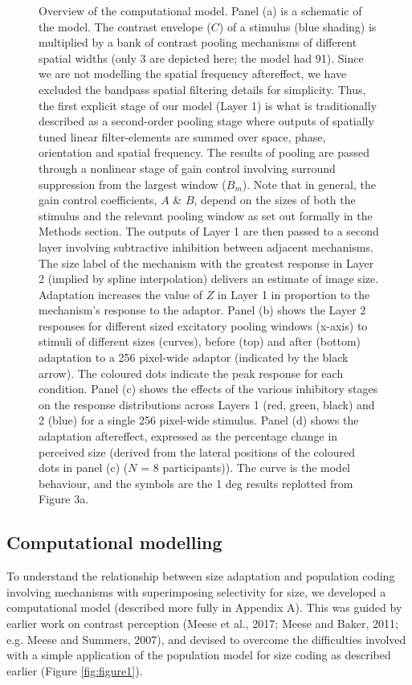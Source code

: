 \documentclass[
]{article}
\begin{document}
\begin{figure}
\caption{Overview of the computational model. Panel (a) is a schematic of the model. The contrast envelope ($C$) of a stimulus (blue shading) is multiplied by a bank of contrast pooling mechanisms of different spatial widths (only 3 are depicted here; the model had 91). Since we are not modelling the spatial frequency aftereffect, we have excluded the bandpass spatial filtering details for simplicity. Thus, the first explicit stage of our model (Layer 1) is what is traditionally described as a second-order pooling stage where outputs of spatially tuned linear filter-elements are summed over space, phase, orientation and spatial frequency. The results of pooling are passed through a nonlinear stage of gain control involving surround suppression from the largest window ($B_m$). Note that in general, the gain control coefficients, $A$ \& $B$, depend on the sizes of both the stimulus and the relevant pooling window as set out formally in the Methods section. The outputs of Layer 1 are then passed to a second layer involving subtractive inhibition between adjacent mechanisms. The size label of the mechanism with the greatest response in Layer 2 (implied by spline interpolation) delivers an estimate of image size. Adaptation increases the value of $Z$ in Layer 1 in proportion to the mechanism’s response to the adaptor. Panel (b) shows the Layer 2 responses for different sized excitatory pooling windows (x-axis) to stimuli of different sizes (curves), before (top) and after (bottom) adaptation to a 256 pixel-wide adaptor (indicated by the black arrow). The coloured dots indicate the peak response for each condition. Panel (c) shows the effects of the various inhibitory stages on the response distributions across Layers 1 (red, green, black) and 2 (blue) for a single 256 pixel-wide stimulus. Panel (d) shows the adaptation aftereffect, expressed as the percentage change in perceived size (derived from the lateral positions of the coloured dots in panel (c) ($N$ = 8 participants)). The curve is the model behaviour, and the symbols are the 1 deg results replotted from Figure 3a.}\label{fig:figure5}
\end{figure}

\hypertarget{computational-modelling}{%
\subsection*{Computational modelling}\label{computational-modelling}}

To understand the relationship between size adaptation and population coding involving mechanisms with superimposing selectivity for size, we developed a computational model (described more fully in Appendix A). This was guided by earlier work on contrast perception (Meese et al., 2017; Meese and Baker, 2011; e.g. Meese and Summers, 2007), and devised to overcome the difficulties involved with a simple application of the population model for size coding as described earlier (Figure \ref{fig:figure1}).
\end{document}
